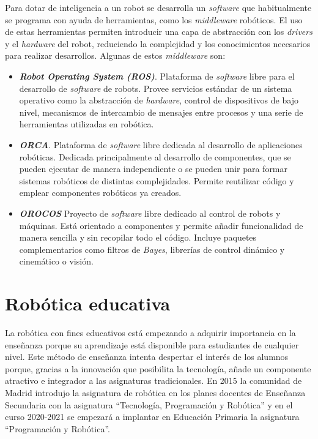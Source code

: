 Para dotar de inteligencia a un robot se desarrolla un \textit{software} que habitualmente se programa con ayuda de herramientas, como los \textit{middleware} robóticos. El uso de estas herramientas permiten introducir una capa de abstracción con los \textit{drivers} y el \textit{hardware} del robot, reduciendo la complejidad y los conocimientos necesarios para realizar desarrollos. Algunas de estos \textit{middleware} son:
\begin{itemize}
    \item \textit{\textbf{Robot Operating System (ROS)}}\cite{bib:ros}. Plataforma de \textit{software} libre para el desarrollo de \textit{software} de robots. Provee servicios estándar de un sistema operativo como la abstracción de \textit{hardware}, control de dispositivos de bajo nivel, mecanismos de intercambio de mensajes entre procesos y una serie de herramientas utilizadas en robótica.
    \item \textit{\textbf{ORCA}}\cite{bib:orca}. Plataforma de \textit{software} libre dedicada al desarrollo de aplicaciones robóticas. Dedicada principalmente al desarrollo de componentes, que se pueden ejecutar de manera independiente o se pueden unir para formar sistemas robóticos de distintas complejidades. Permite reutilizar código y emplear componentes robóticos ya creados.
     \item \textit{\textbf{OROCOS}}\cite{bib:orocos} Proyecto de \textit{software} libre dedicado al control de robots y máquinas. Está orientado a componentes y permite añadir funcionalidad de manera sencilla y sin recopilar todo el código. Incluye paquetes complementarios como filtros de \textit{Bayes}, librerías de control dinámico y cinemático o visión.
\end{itemize}

\section{Robótica educativa}
\label{sec:educativa}
La robótica con fines educativos está empezando a adquirir importancia en la enseñanza porque su aprendizaje está disponible para estudiantes de cualquier nivel. Este método de enseñanza intenta despertar el interés de los alumnos porque, gracias a la innovación que posibilita la tecnología, añade un componente atractivo e integrador a las asignaturas tradicionales. En 2015 la comunidad de Madrid introdujo la asignatura de robótica en los planes docentes de Enseñanza Secundaria con la asignatura ``Tecnología, Programación y Robótica''\cite{bib:secundaria} y en el curso 2020-2021 se empezará a implantar en Educación Primaria la asignatura ``Programación y Robótica''\cite{bib:primaria}.\\

